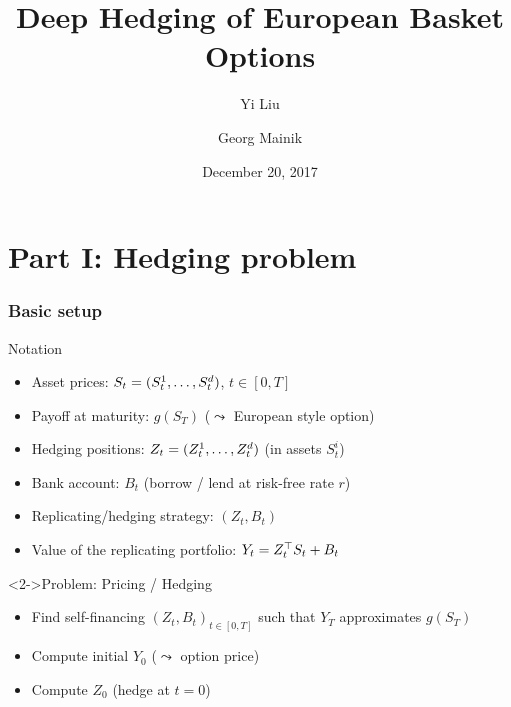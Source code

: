\documentclass[mathserif,10pt]{beamer}
\renewcommand{\alert}[1]{\textcolor{MyRed}{#1}\xspace}
\renewcommand{\emph}[1]{\textbf{#1}\xspace}
\newcommand{\inStructColor}[1]{\textcolor{MyNewDelftBlue}{#1}}
\begin{document}
\title{Deep Hedging of European Basket Options \\ }
\author[Yi Liu \& Georg Mainik]{Yi Liu \and Georg Mainik}
\institute[]{}
\date{December 20, 2017}
%
\begin{frame}[plain]
\setcounter{framenumber}{0}
\titlepage
\end{frame}
\section{Part I: Hedging problem}
\begin{frame}
\frametitle{Basic setup}
\begin{block}{Notation}
\begin{itemize}
\item
\inStructColor{Asset prices:} 
$S_t = ({S_t^1,\ldots, S_t^d})$, $t\in[0,T]$ 
\item
\inStructColor{Payoff at maturity:} $g(S_T)$ ($\leadsto$ European style option)
\item 
\inStructColor{Hedging positions:} 
$Z_t = ({Z_t^1,\ldots,Z_t^d})$ (in assets $S_t^i$)
\item
\inStructColor{Bank account:}
$B_t$ (borrow / lend at \inStructColor{risk-free rate} $r$)
\item
\inStructColor{Replicating/hedging strategy:}
$(Z_t, B_t)$
\item
\inStructColor{Value of the replicating portfolio:}
$Y_t = Z_t^{\top} S_t + B_t$ 
\end{itemize}
\end{block}
\begin{block}<2->{Problem: Pricing / Hedging}
\begin{itemize}
\item 
Find \inStructColor{self-financing} $(Z_t, B_t)_{t\in[0,T]}$ such that $Y_T$ \alert{approximates} $g(S_T)$
\item 
Compute initial $Y_0$ ($\leadsto$ \inStructColor{option price})
\item 
Compute $Z_0$ (\inStructColor{hedge} at $t=0$)
\end{itemize}
\end{block}
\end{frame}
\end{document}
